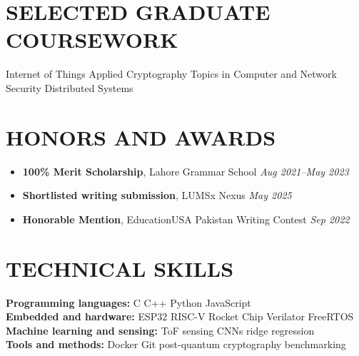 \documentclass[10pt]{article}
\begin{document}
\section*{SELECTED GRADUATE COURSEWORK}
Internet of Things \textperiodcentered{} Applied Cryptography \textperiodcentered{} Topics in Computer and Network Security \textperiodcentered{} Distributed Systems
\section*{HONORS AND AWARDS}
\begin{itemize}
\item \textbf{100\% Merit Scholarship}, Lahore Grammar School \textperiodcentered{} {\itshape Aug 2021--May 2023}
\item \textbf{Shortlisted writing submission}, LUMSx Nexus \textperiodcentered{} {\itshape May 2025}
\item \textbf{Honorable Mention}, EducationUSA Pakistan Writing Contest \textperiodcentered{} {\itshape Sep 2022}
\end{itemize}
\section*{TECHNICAL SKILLS}
\textbf{Programming languages:} C \textperiodcentered{} C++ \textperiodcentered{} Python \textperiodcentered{} JavaScript\\
\textbf{Embedded and hardware:} ESP32 \textperiodcentered{} RISC-V \textperiodcentered{} Rocket Chip \textperiodcentered{} Verilator \textperiodcentered{} FreeRTOS\\
\textbf{Machine learning and sensing:} ToF sensing \textperiodcentered{} CNNs \textperiodcentered{} ridge regression\\
\textbf{Tools and methods:} Docker \textperiodcentered{} Git \textperiodcentered{} post-quantum cryptography benchmarking
\end{document}
